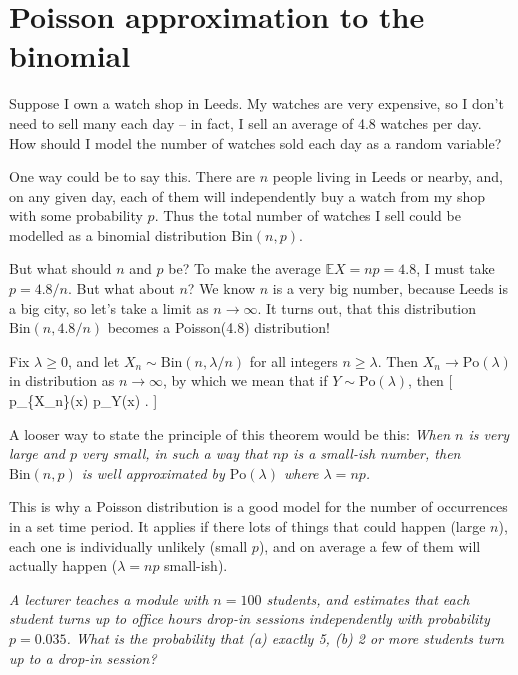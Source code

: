 \documentclass[
  letterpaper,
]{report}
\theoremstyle{definition}
\theoremstyle{definition}
\theoremstyle{remark}
\begin{document}
\hypertarget{poisson-approx}{%
\section{Poisson approximation to the binomial}\label{poisson-approx}}

Suppose I own a watch shop in Leeds. My watches are very expensive, so I
don't need to sell many each day -- in fact, I sell an average of 4.8
watches per day. How should I model the number of watches sold each day
as a random variable?

One way could be to say this. There are \(n\) people living in Leeds or
nearby, and, on any given day, each of them will independently buy a
watch from my shop with some probability \(p\). Thus the total number of
watches I sell could be modelled as a binomial distribution
\(\text{Bin}(n, p)\).

But what should \(n\) and \(p\) be? To make the average
\(\mathbb EX = np = 4.8\), I must take \(p = 4.8/n\). But what about
\(n\)? We know \(n\) is a very big number, because Leeds is a big city,
so let's take a limit as \(n \to \infty\). It turns out, that this
distribution \(\text{Bin}(n, 4.8/n)\) becomes a Poisson(4.8)
distribution!

\leavevmode{}%
Fix \(\lambda \geq 0\), and let \(X_n \sim \text{Bin}(n, \lambda/n)\)
for all integers \(n \geq \lambda\). Then \(X_n \to \text{Po}(\lambda)\)
in distribution as \(n \to \infty\), by which we mean that if
\(Y \sim \text{Po}(\lambda)\), then {[} p\_\{X\_n\}(x) \to p\_Y(x)
\qquad {}. {]}

A looser way to state the principle of this theorem would be this:
\emph{When \(n\) is very large and \(p\) very small, in such a way that
\(np\) is a small-ish number, then \(\text{Bin}(n,p)\) is well
approximated by \(\text{Po}(\lambda)\) where \(\lambda = np\).}

This is why a Poisson distribution is a good model for the number of
occurrences in a set time period. It applies if there lots of things
that could happen (large \(n\)), each one is individually unlikely
(small \(p\)), and on average a few of them will actually happen
(\(\lambda = np\) small-ish).

\emph{A lecturer teaches a module with \(n = 100\) students, and
estimates that each student turns up to office hours drop-in sessions
independently with probability \(p = 0.035\). What is the probability
that (a) exactly 5, (b) 2 or more students turn up to a drop-in
session?}
\end{document}
